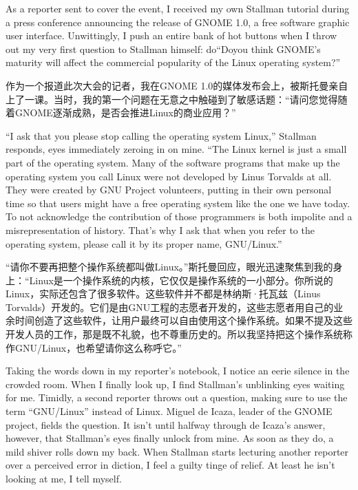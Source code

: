\ifdefined\eng
As a reporter sent to cover the event, I received my own Stallman tutorial during a press conference announcing the release of GNOME 1.0, a free software graphic user interface. Unwittingly, I push an entire bank of hot buttons when I throw out my very first question to Stallman himself: \ifdefined\vone do\fi\ifdefined\vtwo ``Do\fi you think GNOME's maturity will affect the commercial popularity of the Linux operating system?\ifdefined\vtwo ''\fi
\fi

\ifdefined\chs
作为一个报道此次大会的记者，我在GNOME 1.0的媒体发布会上，被斯托曼亲自上了一课。当时，我的第一个问题在无意之中触碰到了敏感话题：``请问您觉得随着GNOME逐渐成熟，是否会推进Linux的商业应用？''
\fi

\ifdefined\eng
``I ask that you please stop calling the operating system Linux,'' Stallman responds, eyes immediately zeroing in on mine. ``The Linux kernel is just a small part of the operating system. Many of the software programs that make up the operating system you call Linux were not developed by Linus Torvalds at all. They were created by GNU Project volunteers, putting in their own personal time so that users might have a free operating system like the one we have today. To not acknowledge the contribution of those programmers is both impolite and a misrepresentation of history. That's why I ask that when you refer to the operating system, please call it by its proper name, GNU/Linux.''
\fi

\ifdefined\chs
``请你不要再把整个操作系统都叫做Linux。''斯托曼回应，眼光迅速聚焦到我的身上：``Linux是一个操作系统的内核，它仅仅是操作系统的一小部分。你所说的Linux，实际还包含了很多软件。这些软件并不都是林纳斯·托瓦兹（Linus Torvalds）开发的。它们是由GNU工程的志愿者开发的，这些志愿者用自己的业余时间创造了这些软件，让用户最终可以自由使用这个操作系统。如果不提及这些开发人员的工作，那是既不礼貌，也不尊重历史的。所以我坚持把这个操作系统称作GNU/Linux，也希望请你这么称呼它。''
\fi

\ifdefined\eng
Taking the words down in my reporter's notebook, I notice an eerie silence in the crowded room. When I finally look up, I find Stallman's unblinking eyes waiting for me. Timidly, a second reporter throws out a question, making sure to use the term ``GNU/Linux'' instead of Linux. Miguel de Icaza, leader of the GNOME project, fields the question. It isn't until halfway through de Icaza's answer, however, that Stallman's eyes finally unlock from mine. As soon as they do, a mild shiver rolls down my back. When Stallman starts lecturing another reporter over a perceived error in diction, I feel a guilty tinge of relief. At least he isn't looking at me, I tell myself.
\fi

